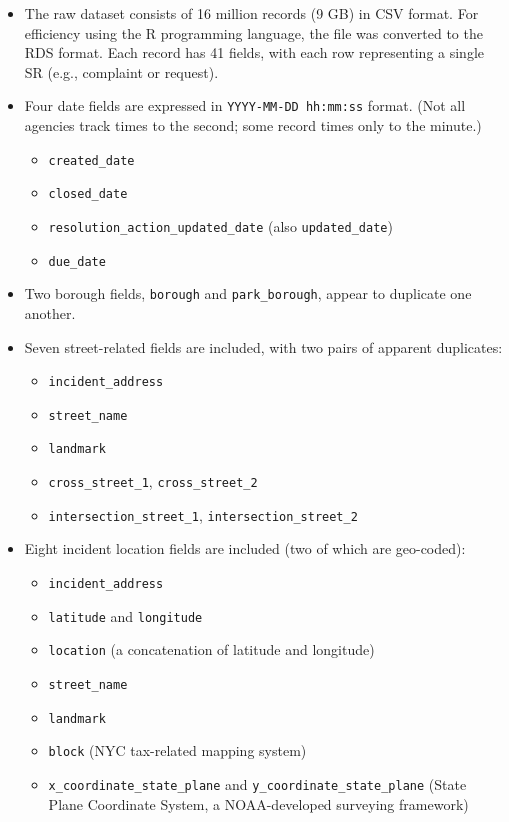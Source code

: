 \documentclass[linenumber]{jdsart}
\begin{document}
\begin{itemize}[left=1.5em]
  	\item The raw dataset consists of 16 million records 
  	(9 GB) in CSV format. For efficiency 
	using the R programming language, the file was 
 	converted to the RDS format. Each record 
	has 41 fields, with each row 
	representing a single SR (e.g., complaint or request).
  
	 \item Four date fields are expressed in \texttt{YYYY-MM-DD hh:mm:ss} format. 
  	(Not all agencies track times to the second; some record times only to the minute.)
    		\begin{itemize}
      			\item \texttt{created\_date}
      			\item \texttt{closed\_date}
      			\item \texttt{resolution\_action\_updated\_date} (also \texttt{updated\_date})
      			\item \texttt{due\_date}
    		\end{itemize}
  
  	\item Two borough fields, \texttt{borough} and \texttt{park\_borough}, appear 
  	to duplicate one another.
  
  	\item Seven street-related fields are included, with two pairs of apparent duplicates:
    		\begin{itemize}
      			\item \texttt{incident\_address}
      			\item \texttt{street\_name}
     			 \item \texttt{landmark}
      			\item \texttt{cross\_street\_1}, \texttt{cross\_street\_2}
      			\item \texttt{intersection\_street\_1}, \texttt{intersection\_street\_2}
    		\end{itemize}
  
	  \item Eight incident location fields are included (two of which are geo-coded):
		 \begin{itemize}
    			\item \texttt{incident\_address}
    			\item \texttt{latitude} and \texttt{longitude}
    			\item \texttt{location} (a concatenation of latitude and longitude)
    			\item \texttt{street\_name}
    			\item \texttt{landmark}
    			\item \texttt{block} (NYC tax-related mapping system)
    			\item \texttt{x\_coordinate\_state\_plane} and \texttt{y\_coordinate\_state\_plane} 
         		(State Plane Coordinate System, a NOAA-developed surveying framework)
 	 	\end{itemize}
\end{itemize} 
\end{document}
